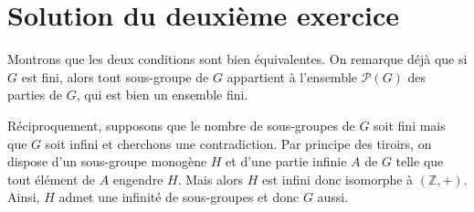 \section{Solution du deuxième exercice}

Montrons que les deux conditions sont bien équivalentes. On remarque déjà que si 
$G$ est fini, alors tout sous-groupe de $G$ appartient à l'ensemble $\mathscr P(G)$ des parties de $G$, qui est bien un ensemble fini.

Réciproquement, supposons que le nombre de sous-groupes de $G$ soit fini mais que $G$ soit infini et cherchons une contradiction.
Par principe des tiroirs, on dispose d'un sous-groupe monogène $H$ et d'une partie infinie $A$ de $G$ telle que tout élément de $A$ engendre $H$.
Mais alors $H$ est infini donc isomorphe à $(\mathbb Z,+)$. Ainsi, $H$ admet une infinité de sous-groupes et donc $G$ aussi.
